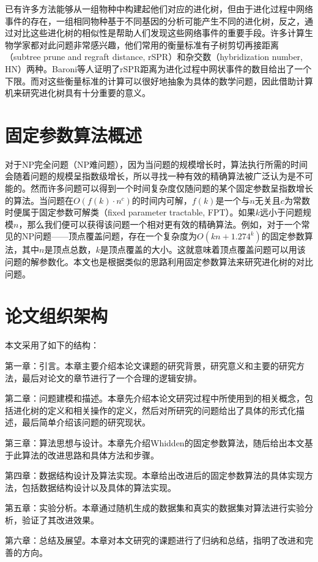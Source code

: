 已有许多方法能够从一组物种中构建起他们对应的进化树，但由于进化过程中网络事件的存在，一组相同物种基于不同基因的分析可能产生不同的进化树，反之，通过对比这些进化树的相似性是帮助人们发现这些网络事件的重要手段。许多计算生物学家都对此问题非常感兴趣，他们常用的衡量标准有子树剪切再接距离（subtree prune and regraft distance, rSPR）和杂交数（hybridization number, HN）两种。Baroni等人证明了rSPR距离为进化过程中网状事件的数目给出了一个下限。而对这些衡量标准的计算可以很好地抽象为具体的数学问题，因此借助计算机来研究进化树具有十分重要的意义。

\section{固定参数算法概述}
对于NP完全问题（NP难问题），因为当问题的规模增长时，算法执行所需的时间会随着问题的规模呈指数级增长，所以寻找一种有效的精确算法被广泛认为是不可能的。然而许多问题可以得到一个时间复杂度仅随问题的某个固定参数呈指数增长的算法。当问题在$O(f(k) \cdot n^c)$的时间内可解，$f(k)$是一个与$n$无关且$c$为常数时便属于固定参数可解类（fixed parameter tractable, FPT）。如果$k$远小于问题规模$n$，那么我们便可以获得该问题一个相对更有效的精确算法。例如，对于一个常见的NP问题——顶点覆盖问题，存在一个复杂度为$O(kn+1.274^k)$的固定参数算法，其中$n$是顶点总数，$k$是顶点覆盖的大小。这就意味着顶点覆盖问题可以用该问题的解参数化。本文也是根据类似的思路利用固定参数算法来研究进化树的对比问题。


\section{论文组织架构}
本文采用了如下的结构：

第一章：引言。本章主要介绍本论文课题的研究背景，研究意义和主要的研究方法，最后对论文的章节进行了一个合理的逻辑安排。

第二章：问题建模和描述。本章先介绍本论文研究过程中所使用到的相关概念，包括进化树的定义和相关操作的定义，然后对所研究的问题给出了具体的形式化描述，最后简单介绍该问题的研究现状。

第三章：算法思想与设计。本章先介绍Whidden的固定参数算法，随后给出本文基于此算法的改进思路和具体方法和步骤。

第四章：数据结构设计及算法实现。本章给出改进后的固定参数算法的具体实现方法，包括数据结构设计以及具体的算法实现。

第五章：实验分析。本章通过随机生成的数据集和真实的数据集对算法进行实验分析，验证了其改进效果。

第六章：总结及展望。本章对本文研究的课题进行了归纳和总结，指明了改进和完善的方向。
